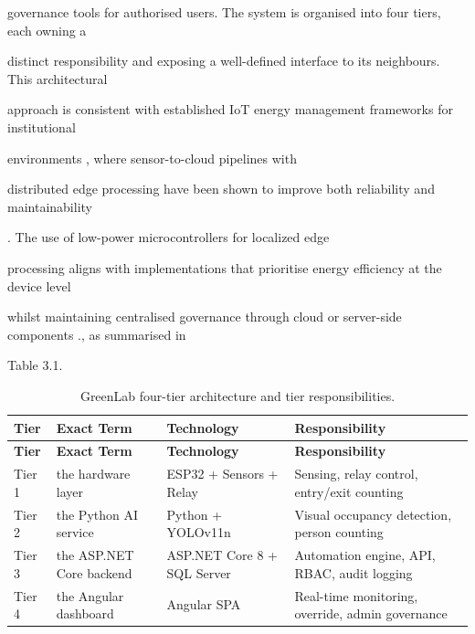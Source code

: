 governance tools for authorised users. The system is organised into four tiers, each owning a

distinct responsibility and exposing a well-defined interface to its neighbours. This architectural

approach is consistent with established IoT energy management frameworks for institutional

environments \cite{wibowo2023,prasad2024}, where sensor-to-cloud pipelines with

distributed edge processing have been shown to improve both reliability and maintainability

\cite{mwangi2024,patel2024b}. The use of low-power microcontrollers for localized edge

processing aligns with implementations that prioritise energy eﬃciency at the device level

whilst maintaining centralised governance through cloud or server-side components
\cite{anderson2024}., as summarised in

Table 3.1.

\begin{longtable}{|L{1.4cm}|L{3.4cm}|L{3.4cm}|L{5.2cm}|}
	\caption{GreenLab four-tier architecture and tier responsibilities.} \label{tab:3-1}                                      \\
	\hline
	\textbf{Tier} & \textbf{Exact Term}      & \textbf{Technology}         & \textbf{Responsibility}                          \\
	\hline
	\endfirsthead
	\hline
	\textbf{Tier} & \textbf{Exact Term}      & \textbf{Technology}         & \textbf{Responsibility}                          \\
	\hline
	\endhead
	\hline
	\endfoot
	\hline
	\endlastfoot
	Tier 1        & the hardware layer       & ESP32 + Sensors + Relay     & Sensing, relay control, entry/exit counting      \\
	\hline
	Tier 2        & the Python AI service    & Python + YOLOv11n           & Visual occupancy detection, person counting      \\
	\hline
	Tier 3        & the ASP.NET Core backend & ASP.NET Core 8 + SQL Server & Automation engine, API, RBAC, audit logging      \\
	\hline
	Tier 4        & the Angular dashboard    & Angular SPA                 & Real-time monitoring, override, admin governance \\
	\hline
\end{longtable}

